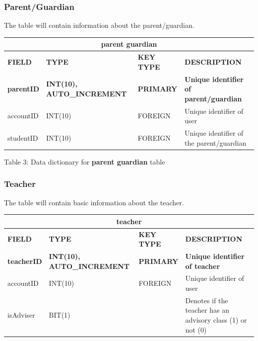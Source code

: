 \documentclass[11pt,a4paper,titlepage]{article}
\begin{document}
\newpage

\subsubsection{Parent/Guardian}

The table will contain information about the parent/guardian.

\vspace{1cm}
\begin{longtable}{ |p{2.5cm}|p{4.5cm}|p{2.5cm}|p{3cm}|  }
    \hline
    \multicolumn{4}{|c|}{\textbf{parent guardian}} \\
    \hline
    \textbf{FIELD}&\textbf{TYPE}&\textbf{KEY TYPE}&\textbf{DESCRIPTION}\\
    \hline
    \textbf{parentID}   & \textbf{INT(10), AUTO\_INCREMENT}  & \textbf{PRIMARY} & \textbf{Unique identifier of parent/guardian}\\ \hline
    accountID& INT(10) & FOREIGN & Unique identifier of user \\ \hline
    studentID& INT(10) & FOREIGN & Unique identifier of the parent/guardian\\ \hline
\end{longtable}

\vspace{.5cm}
\begin{center}
    Table 3: Data dictionary for \textbf{parent guardian} table
\end{center}

\newpage

\subsubsection{Teacher}

The table will contain basic information about the teacher.

\vspace{1cm}
\begin{longtable}{ |p{2.5cm}|p{4.5cm}|p{2.5cm}|p{3cm}|  }
    \hline
    \multicolumn{4}{|c|}{\textbf{teacher}} \\
    \hline
    \textbf{FIELD}&\textbf{TYPE}&\textbf{KEY TYPE}&\textbf{DESCRIPTION}\\
    \hline
    \textbf{teacherID}   & \textbf{INT(10), AUTO\_INCREMENT}  & \textbf{PRIMARY} & \textbf{Unique identifier of teacher}\\ \hline
    accountID& INT(10) & FOREIGN & Unique identifier of user \\ \hline
    isAdviser& BIT(1) & & Denotes if the teacher has an advisory class (1) or not (0) \\ \hline
\end{longtable}
\end{document}
